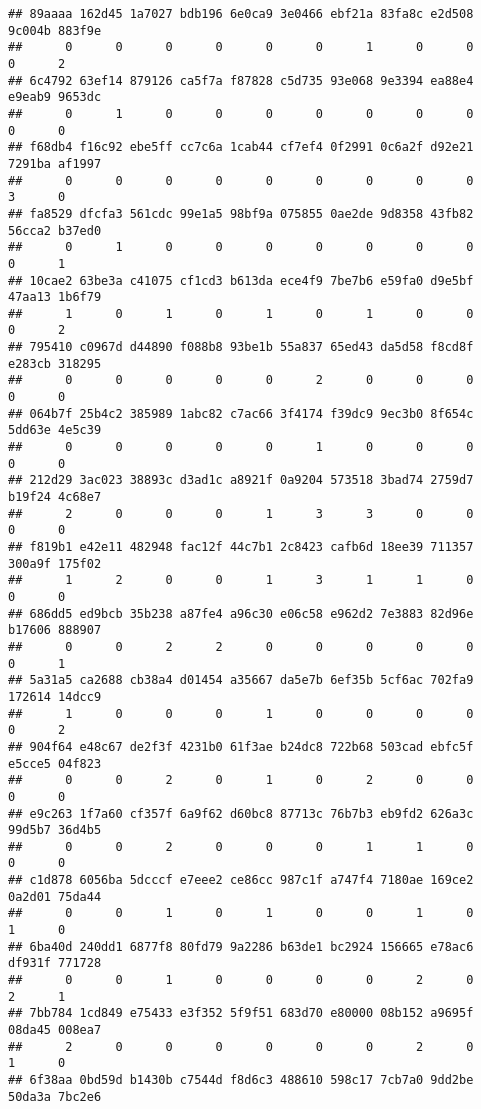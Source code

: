 \documentclass[
]{article}
\begin{document}
\begin{verbatim}
## 89aaaa 162d45 1a7027 bdb196 6e0ca9 3e0466 ebf21a 83fa8c e2d508 9c004b 883f9e 
##      0      0      0      0      0      0      1      0      0      0      2 
## 6c4792 63ef14 879126 ca5f7a f87828 c5d735 93e068 9e3394 ea88e4 e9eab9 9653dc 
##      0      1      0      0      0      0      0      0      0      0      0 
## f68db4 f16c92 ebe5ff cc7c6a 1cab44 cf7ef4 0f2991 0c6a2f d92e21 7291ba af1997 
##      0      0      0      0      0      0      0      0      0      3      0 
## fa8529 dfcfa3 561cdc 99e1a5 98bf9a 075855 0ae2de 9d8358 43fb82 56cca2 b37ed0 
##      0      1      0      0      0      0      0      0      0      0      1 
## 10cae2 63be3a c41075 cf1cd3 b613da ece4f9 7be7b6 e59fa0 d9e5bf 47aa13 1b6f79 
##      1      0      1      0      1      0      1      0      0      0      2 
## 795410 c0967d d44890 f088b8 93be1b 55a837 65ed43 da5d58 f8cd8f e283cb 318295 
##      0      0      0      0      0      2      0      0      0      0      0 
## 064b7f 25b4c2 385989 1abc82 c7ac66 3f4174 f39dc9 9ec3b0 8f654c 5dd63e 4e5c39 
##      0      0      0      0      0      1      0      0      0      0      0 
## 212d29 3ac023 38893c d3ad1c a8921f 0a9204 573518 3bad74 2759d7 b19f24 4c68e7 
##      2      0      0      0      1      3      3      0      0      0      0 
## f819b1 e42e11 482948 fac12f 44c7b1 2c8423 cafb6d 18ee39 711357 300a9f 175f02 
##      1      2      0      0      1      3      1      1      0      0      0 
## 686dd5 ed9bcb 35b238 a87fe4 a96c30 e06c58 e962d2 7e3883 82d96e b17606 888907 
##      0      0      2      2      0      0      0      0      0      0      1 
## 5a31a5 ca2688 cb38a4 d01454 a35667 da5e7b 6ef35b 5cf6ac 702fa9 172614 14dcc9 
##      1      0      0      0      1      0      0      0      0      0      2 
## 904f64 e48c67 de2f3f 4231b0 61f3ae b24dc8 722b68 503cad ebfc5f e5cce5 04f823 
##      0      0      2      0      1      0      2      0      0      0      0 
## e9c263 1f7a60 cf357f 6a9f62 d60bc8 87713c 76b7b3 eb9fd2 626a3c 99d5b7 36d4b5 
##      0      0      2      0      0      0      1      1      0      0      0 
## c1d878 6056ba 5dcccf e7eee2 ce86cc 987c1f a747f4 7180ae 169ce2 0a2d01 75da44 
##      0      0      1      0      1      0      0      1      0      1      0 
## 6ba40d 240dd1 6877f8 80fd79 9a2286 b63de1 bc2924 156665 e78ac6 df931f 771728 
##      0      0      1      0      0      0      0      2      0      2      1 
## 7bb784 1cd849 e75433 e3f352 5f9f51 683d70 e80000 08b152 a9695f 08da45 008ea7 
##      2      0      0      0      0      0      0      2      0      1      0 
## 6f38aa 0bd59d b1430b c7544d f8d6c3 488610 598c17 7cb7a0 9dd2be 50da3a 7bc2e6 

\end{verbatim}
\end{document}
